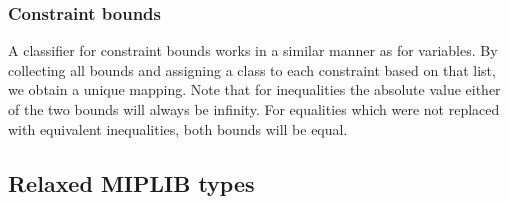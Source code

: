 				
			\subsubsection{Constraint bounds}
			
				A classifier for constraint bounds works in a similar manner as for variables.
				By collecting all bounds and assigning a class to each constraint based on that list, we obtain a unique mapping.
				Note that for inequalities the absolute value either of the two bounds will always be infinity. For equalities which were not replaced with equivalent inequalities, both bounds will be equal.
				
				
				\clearpage
		
		\subsection{Relaxed MIPLIB types}
			
